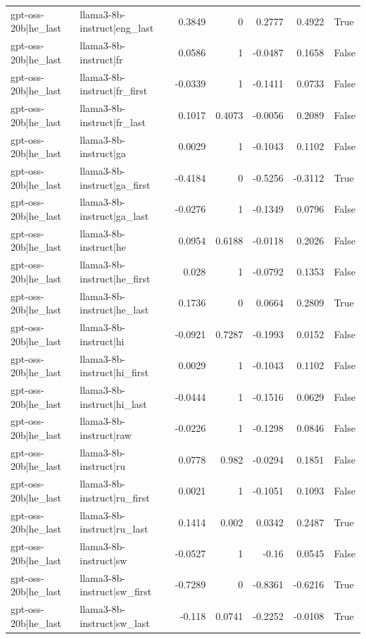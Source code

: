 \begin{table}
\begin{tabular}{l l r r r r l}
gpt-oss-20b|he_last & llama3-8b-instruct|eng_last & 0.3849 & 0 & 0.2777 & 0.4922 & True \\
gpt-oss-20b|he_last & llama3-8b-instruct|fr & 0.0586 & 1 & -0.0487 & 0.1658 & False \\
gpt-oss-20b|he_last & llama3-8b-instruct|fr_first & -0.0339 & 1 & -0.1411 & 0.0733 & False \\
gpt-oss-20b|he_last & llama3-8b-instruct|fr_last & 0.1017 & 0.4073 & -0.0056 & 0.2089 & False \\
gpt-oss-20b|he_last & llama3-8b-instruct|ga & 0.0029 & 1 & -0.1043 & 0.1102 & False \\
gpt-oss-20b|he_last & llama3-8b-instruct|ga_first & -0.4184 & 0 & -0.5256 & -0.3112 & True \\
gpt-oss-20b|he_last & llama3-8b-instruct|ga_last & -0.0276 & 1 & -0.1349 & 0.0796 & False \\
gpt-oss-20b|he_last & llama3-8b-instruct|he & 0.0954 & 0.6188 & -0.0118 & 0.2026 & False \\
gpt-oss-20b|he_last & llama3-8b-instruct|he_first & 0.028 & 1 & -0.0792 & 0.1353 & False \\
gpt-oss-20b|he_last & llama3-8b-instruct|he_last & 0.1736 & 0 & 0.0664 & 0.2809 & True \\
gpt-oss-20b|he_last & llama3-8b-instruct|hi & -0.0921 & 0.7287 & -0.1993 & 0.0152 & False \\
gpt-oss-20b|he_last & llama3-8b-instruct|hi_first & 0.0029 & 1 & -0.1043 & 0.1102 & False \\
gpt-oss-20b|he_last & llama3-8b-instruct|hi_last & -0.0444 & 1 & -0.1516 & 0.0629 & False \\
gpt-oss-20b|he_last & llama3-8b-instruct|raw & -0.0226 & 1 & -0.1298 & 0.0846 & False \\
gpt-oss-20b|he_last & llama3-8b-instruct|ru & 0.0778 & 0.982 & -0.0294 & 0.1851 & False \\
gpt-oss-20b|he_last & llama3-8b-instruct|ru_first & 0.0021 & 1 & -0.1051 & 0.1093 & False \\
gpt-oss-20b|he_last & llama3-8b-instruct|ru_last & 0.1414 & 0.002 & 0.0342 & 0.2487 & True \\
gpt-oss-20b|he_last & llama3-8b-instruct|sw & -0.0527 & 1 & -0.16 & 0.0545 & False \\
gpt-oss-20b|he_last & llama3-8b-instruct|sw_first & -0.7289 & 0 & -0.8361 & -0.6216 & True \\
gpt-oss-20b|he_last & llama3-8b-instruct|sw_last & -0.118 & 0.0741 & -0.2252 & -0.0108 & True \\

\end{tabular}
\end{table}
